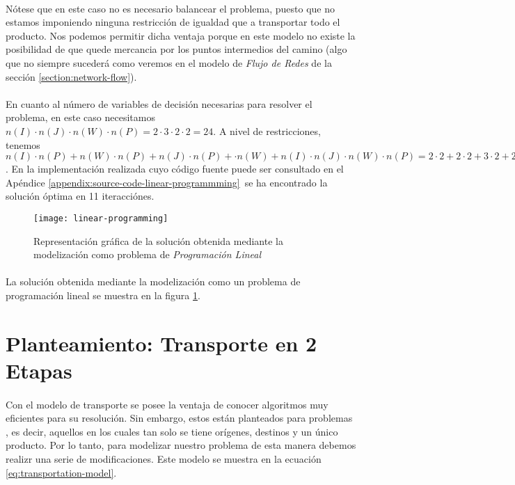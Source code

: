 \documentclass{article}
\begin{document}
    \paragraph{}
    Nótese que en este caso no es necesario balancear el problema, puesto que no estamos imponiendo ninguna restricción de igualdad que  a transportar todo el producto. Nos podemos permitir dicha ventaja porque en este modelo no existe la posibilidad de que quede mercancia por los puntos intermedios del camino (algo que no siempre sucederá como veremos en el modelo de \emph{Flujo de Redes} de la sección \ref{section:network-flow}).

    \paragraph{}
    En cuanto al número de variables de decisión necesarias para resolver el problema, en este caso necesitamos $n(I) \cdot n(J) \cdot n(W) \cdot n(P) = 2 \cdot 3 \cdot 2 \cdot 2 = 24$. A nivel de restricciones, tenemos $n(I) \cdot n(P) + n(W) \cdot n(P) + n(J) \cdot n(P) + \cdot n(W) + n(I) \cdot n(J) \cdot n(W) \cdot n(P) = 2 \cdot 2 + 2 \cdot 2 + 3 \cdot 2 + 2 \cdot 3 \cdot 2 \cdot 2 = 38$. En la implementación realizada cuyo código fuente puede ser consultado en el Apéndice \ref{appendix:source-code-linear-programmming} se ha encontrado la solución óptima en 11 iteracciónes.

    \begin{figure}[!hp]
      \centering
      \texttt{[image: linear-programming]}
      \caption{Representación gráfica de la solución obtenida mediante la modelización como problema de \emph{Programación Lineal}}
      \label{img:graph-linear-programming}
    \end{figure}

    \paragraph{}
    La solución obtenida mediante la modelización como un problema de programación lineal se muestra en la figura \ref{img:graph-linear-programming}.


  \section{Planteamiento: Transporte en 2 Etapas}
  \label{section:transportation}

    \paragraph{}
    Con el modelo de transporte se posee la ventaja de conocer algoritmos muy eficientes para su resolución. Sin embargo, estos están planteados para problemas , es decir, aquellos en los cuales tan solo se tiene orígenes, destinos y un único producto. Por lo tanto, para modelizar nuestro problema de esta manera debemos realizr una serie de modificaciones. Este modelo se muestra en la ecuación \eqref{eq:transportation-model}.
\end{document}
